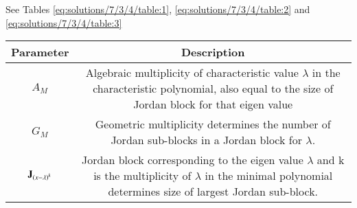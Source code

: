 See Tables \ref{eq:solutions/7/3/4/table:1}, \ref{eq:solutions/7/3/4/table:2} 
and \ref{eq:solutions/7/3/4/table:3}
%
\begin{table*}[ht!]
\begin{center}
\resizebox{2\columnwidth}{!}
{
\begin{tabular}{|c|c|}
\hline
\textbf{Parameter} & \textbf{Description}
\\ [0.5ex] 
\hline
$A_M$ & Algebraic multiplicity of characteristic value $\lambda$ in the characteristic polynomial, also equal to the size of Jordan block for that eigen value
\\ [0.5ex] 
\hline
$G_M$ & Geometric multiplicity determines the number of Jordan sub-blocks in a Jordan block for $\lambda$.
\\ [0.5ex] 
\hline
$\mathbf{J}_{\left(x-\lambda\right)^k}$ & Jordan block corresponding to the eigen value $\lambda$ and k is the multiplicity of $\lambda$ in the minimal polynomial determines size of largest Jordan sub-block.
\\ [0.5ex] 
\hline
\end{tabular}
}
\caption{Parameters}
\label{eq:solutions/7/3/4/table:1}
\end{center}
\end{table*}


